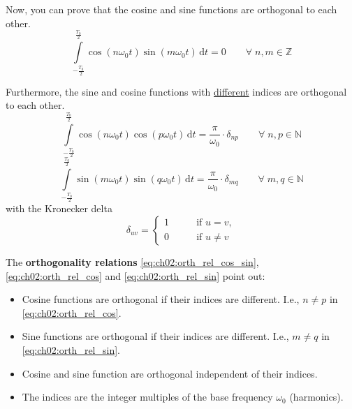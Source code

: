 \begin{refsection}
Now, you can prove that the cosine and sine functions are orthogonal to each other.
\begin{equation}
	\int\limits_{-\frac{T_0}{2}}^{\frac{T_0}{2}} \cos\left(n \omega_0 t\right) \sin\left(m \omega_0 t\right) \, \mathrm{d} t = 0 \qquad \forall \; n, m \in \mathbb{Z}
	\label{eq:ch02:orth_rel_cos_sin}
\end{equation}

Furthermore, the sine and cosine functions with \underline{different} indices are orthogonal to each other.
\begin{equation}
	\int\limits_{-\frac{T_0}{2}}^{\frac{T_0}{2}} \cos\left(n \omega_0 t\right) \cos\left(p \omega_0 t\right) \, \mathrm{d} t = \frac{\pi}{\omega_0} \cdot \delta_{np} \qquad \forall \; n, p \in \mathbb{N}
	\label{eq:ch02:orth_rel_cos}
\end{equation}
\begin{equation}
	\int\limits_{-\frac{T_0}{2}}^{\frac{T_0}{2}} \sin\left(m \omega_0 t\right) \sin\left(q \omega_0 t\right) \, \mathrm{d} t = \frac{\pi}{\omega_0} \cdot \delta_{mq} \qquad \forall \; m, q \in \mathbb{N}
	\label{eq:ch02:orth_rel_sin}
\end{equation}
with the Kronecker delta
\begin{equation}
	\delta_{uv} = \begin{cases}
		1 & \qquad \text{if } u = v, \\
		0 & \qquad \text{if } u \neq v
	\end{cases}
	\label{eq:ch02:kronecker_delta}
\end{equation}%

The  \textbf{orthogonality relations} \eqref{eq:ch02:orth_rel_cos_sin}, \eqref{eq:ch02:orth_rel_cos} and \eqref{eq:ch02:orth_rel_sin} point out:
\begin{itemize}
	\item Cosine functions are orthogonal if their indices are different. I.e., $n \neq p$ in \eqref{eq:ch02:orth_rel_cos}.
	\item Sine functions are orthogonal if their indices are different. I.e., $m \neq q$ in \eqref{eq:ch02:orth_rel_sin}.
	\item Cosine and sine function are orthogonal independent of their indices.
	\item The indices are the integer multiples of the base frequency $\omega_0$ (harmonics).
\end{itemize}


\end{refsection}
